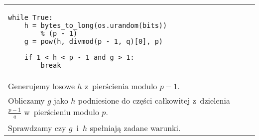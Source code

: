 \documentclass{article}
\begin{document}
        \noindent\begin{table}[ht!]
            \begin{tabular}{lr}
                \begin{minipage}[t]{0.45\textwidth}
                    \begin{verbatim}
while True:
    h = bytes_to_long(os.urandom(bits)) 
        % (p - 1)
    g = pow(h, divmod(p - 1, q)[0], p)

    if 1 < h < p - 1 and g > 1:
        break
                    \end{verbatim}
                \end{minipage}
                
                &
        
                \begin{minipage}[t]{0.45\textwidth}                    
                    \noindent \\ Generujemy losowe $h$ z~pierścienia modulo $p - 1$. \\
                    
                    \noindent Obliczamy $g$ jako $h$ podniesione do części całkowitej z~dzielenia $\frac{p-1}{q}$ w~pierścieniu modulo $p$. \\
                    
                    \noindent Sprawdzamy czy $g$~i~$h$ spełniają zadane warunki.
                \end{minipage}
            
                \\
            
            \end{tabular}
        \end{table}
            
\end{document}
